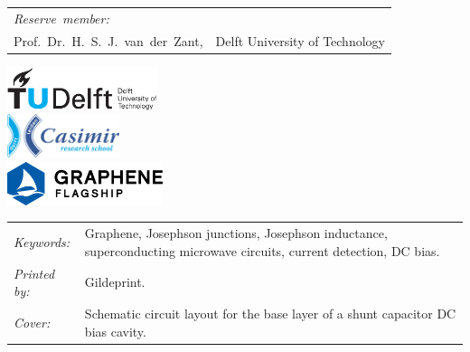 \begin{titlepage}
\begin{tabular}{p{3.5cm}l}
    \medskip
    \mbox{\emph{Reserve member:}} & \\

    Prof.~Dr.~H.~S.~J.~van~der~Zant, & Delft University of Technology \\

\end{tabular}


\vfill
\begin{center}
    \centering
    \includegraphics[height=0.5in]{title/logos/tudelft}\\
    \vspace{1em}
    \includegraphics[height=0.5in]{title/logos/casimir}\\
    \vspace{1em}
    \includegraphics[height=0.5in]{title/logos/graphene_flagship_logo_blue}
\end{center}
\vfill

\noindent
\begin{tabular}{@{}p{}@{}p{}}
    \textit{Keywords:} & Graphene, Josephson junctions, Josephson inductance, superconducting microwave circuits, current detection, DC bias. \\
    \textit{Printed by:} &  Gildeprint. \\
    \textit{Cover:} & Schematic circuit layout for the base layer of a shunt capacitor DC bias cavity.
\end{tabular}


\end{titlepage}
